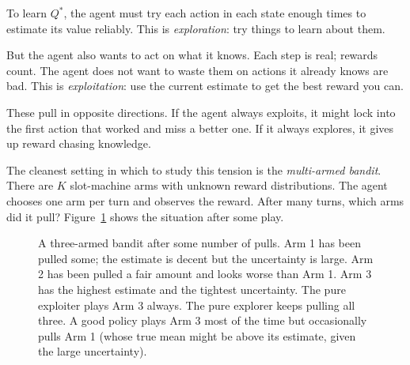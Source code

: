 To learn $Q^*$, the agent must try each action in each state enough times to estimate its value reliably. This is \emph{exploration}: try things to learn about them.

But the agent also wants to act on what it knows. Each step is real; rewards count. The agent does not want to waste them on actions it already knows are bad. This is \emph{exploitation}: use the current estimate to get the best reward you can.

These pull in opposite directions. If the agent always exploits, it might lock into the first action that worked and miss a better one. If it always explores, it gives up reward chasing knowledge.

The cleanest setting in which to study this tension is the \emph{multi-armed bandit}. There are $K$ slot-machine arms with unknown reward distributions. The agent chooses one arm per turn and observes the reward. After many turns, which arms did it pull? Figure~\ref{fig:bandit} shows the situation after some play.

\begin{figure}[h]
\centering
{}
\caption{A three-armed bandit after some number of pulls. Arm 1 has been pulled some; the estimate is decent but the uncertainty is large. Arm 2 has been pulled a fair amount and looks worse than Arm 1. Arm 3 has the highest estimate and the tightest uncertainty. The pure exploiter plays Arm 3 always. The pure explorer keeps pulling all three. A good policy plays Arm 3 most of the time but occasionally pulls Arm 1 (whose true mean might be above its estimate, given the large uncertainty).}
\label{fig:bandit}
\end{figure}

